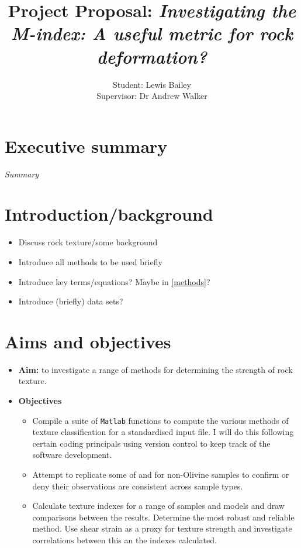 \documentclass[]{article}
\title{\textbf{Project Proposal: \textit{Investigating the M-index: A useful metric for rock deformation?}}}
\author{Student: Lewis Bailey\\Supervisor: Dr Andrew Walker}
\date{}
\numberwithin{equation}{section}
\begin{document}
\maketitle

\section{Executive summary}
\textit{Summary}

\section{Introduction/background} \label{intro}

\begin{itemize}

	\item Discuss rock texture/some background 
	\item Introduce all methods to be used briefly \citep{Mainprice}
	\item Introduce key terms/equations? Maybe in \ref{methods}? 
	\item Introduce (briefly) data sets? 
	
\end{itemize}

\section{Aims and objectives}

\begin{itemize}
	\item \textbf{Aim:} to investigate a range of methods for determining the strength of rock texture.
	 
	\item \textbf{Objectives}
	\begin{itemize}
		\item Compile a suite of \texttt{Matlab} functions to compute the various methods of texture classification for a standardised input file. I will do this following certain coding principals \citep{Computing} using version control to keep track of the software development.
		\item Attempt to replicate some of \cite{Skemer} and \cite{Mainprice} for non-Olivine samples to confirm or deny their observations are consistent across sample types.
		\item Calculate texture indexes for a range of samples and models and draw comparisons between the results. Determine the most robust and reliable method. Use shear strain as a proxy for texture strength and investigate correlations between this an the indexes calculated.
	\end{itemize}
\end{itemize}
\end{document}
